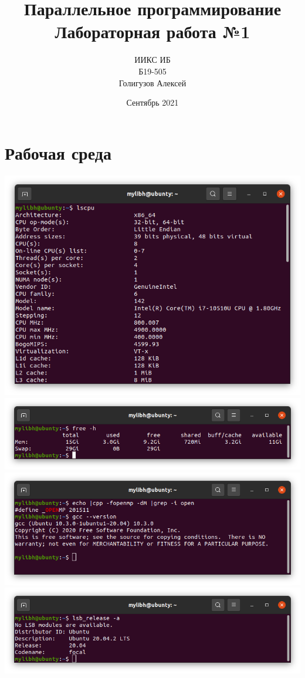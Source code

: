 \documentclass{article}
\title{Параллельное программирование\\Лабораторная работа №1}
\author{ИИКС ИБ\\Б19-505\\Голигузов Алексей}
\date{Сентябрь 2021}
\begin{document}
\maketitle
\newpage
\tableofcontents

\newpage
\section{Рабочая среда}
\includegraphics[width=\textwidth]{lscpu.png}
\includegraphics[width=\textwidth]{ram.png}
\includegraphics[width=\textwidth]{openmpgcc.png}
\includegraphics[width=\textwidth]{lsb.png}
\end{document}
